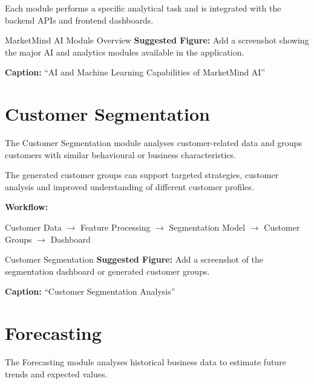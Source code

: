 \documentclass[12pt,a4paper]{report}
\begin{document}
Each module performs a specific analytical task and is integrated with
the backend APIs and frontend dashboards.

\begin{screenshotplaceholder}{MarketMind AI Module Overview}
\textbf{Suggested Figure:} Add a screenshot showing the major AI and
analytics modules available in the application.

\textbf{Caption:} ``AI and Machine Learning Capabilities of MarketMind AI''
\end{screenshotplaceholder}



\section{Customer Segmentation}

The Customer Segmentation module analyses customer-related data and
groups customers with similar behavioural or business characteristics.

The generated customer groups can support targeted strategies,
customer analysis and improved understanding of different customer
profiles.

\textbf{Workflow:}

\begin{center}
Customer Data
$\rightarrow$
Feature Processing
$\rightarrow$
Segmentation Model
$\rightarrow$
Customer Groups
$\rightarrow$
Dashboard
\end{center}

\begin{screenshotplaceholder}{Customer Segmentation}
\textbf{Suggested Figure:} Add a screenshot of the segmentation
dashboard or generated customer groups.

\textbf{Caption:} ``Customer Segmentation Analysis''
\end{screenshotplaceholder}



\section{Forecasting}

The Forecasting module analyses historical business data to estimate
future trends and expected values.
\end{document}
